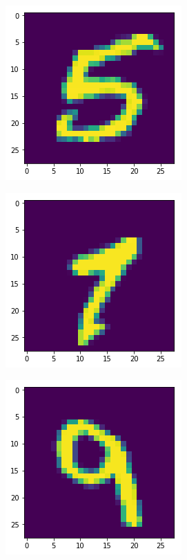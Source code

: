 \begin{figure}[H]
\centering
\begin{subfigure}{.3\linewidth}
 \centering
 \includegraphics[scale=0.4]{chapter_3_figures/unseen_5.png}
\end{subfigure}
 \hfill
\begin{subfigure}{.3\linewidth}
 \centering
 \includegraphics[scale=0.4]{chapter_3_figures/unseen_7.png}
\end{subfigure}
 \hfill
\begin{subfigure}{.3\linewidth}
 \centering
 \includegraphics[scale=0.4]{chapter_3_figures/unseen_9.png}
\end{subfigure}


\end{figure}
